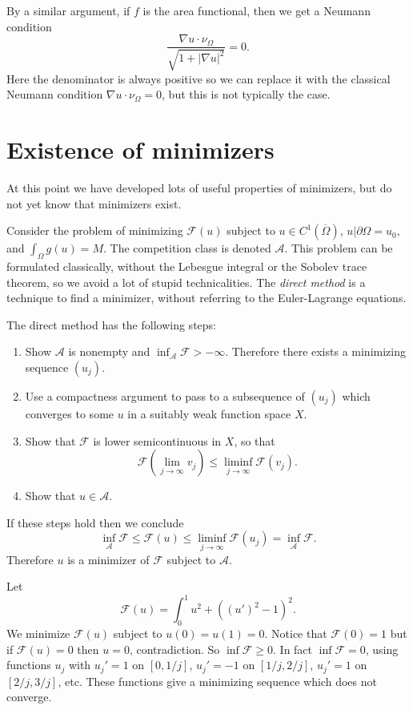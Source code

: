\documentclass[12pt]{book}
\newcommand{\dfn}[1]{\emph{#1}\index{#1}}
\theoremstyle{definition}
\newenvironment{example}
  {\pushQED{\qed}\renewcommand{\qedsymbol}{$\diamondsuit$}\examplex}
  {\popQED\endexamplex}
\begin{document}
\begin{example}
By a similar argument, if $f$ is the area functional, then we get a Neumann condition
$$\frac{\nabla u \cdot \nu_\Omega}{\sqrt{1 + |\nabla u|^2}} = 0.$$
Here the denominator is always positive so we can replace it with the classical Neumann condition $\nabla u \cdot \nu_\Omega = 0$, but this is not typically the case.
\end{example}

\section{Existence of minimizers}
At this point we have developed lots of useful properties of minimizers, but do not yet know that minimizers exist.

Consider the problem of minimizing $\mathcal F(u)$ subject to $u \in C^1(\overline \Omega)$, $u|\partial \Omega = u_0$, and $\int_\Omega g(u) = M$. The competition class is denoted $\mathcal A$.
This problem can be formulated classically, without the Lebesgue integral or the Sobolev trace theorem, so we avoid a lot of stupid technicalities.
The \dfn{direct method} is a technique to find a minimizer, without referring to the Euler-Lagrange equations.

The direct method has the following steps:
\begin{enumerate}
\item Show $\mathcal A$ is nonempty and $\inf_{\mathcal A} \mathcal F > -\infty$. Therefore there exists a minimizing sequence $(u_j)$.
\item Use a compactness argument to pass to a subsequence of $(u_j)$ which converges to some $u$ in a suitably weak function space $X$.
\item Show that $\mathcal F$ is lower semicontinuous in $X$, so that
$$\mathcal F\left(\lim_{j \to \infty} v_j\right) \leq \liminf_{j \to \infty} \mathcal F(v_j).$$
\item Show that $u \in \mathcal A$.
\end{enumerate}
If these steps hold then we conclude
$$\inf_{\mathcal A} \mathcal F \leq \mathcal F(u) \leq \liminf_{j \to \infty} \mathcal F(u_j) = \inf_{\mathcal A} \mathcal F.$$
Therefore $u$ is a minimizer of $\mathcal F$ subject to $\mathcal A$.

\begin{example}
Let
$$\mathcal F(u) = \int_0^1 u^2 + ((u')^2 - 1)^2.$$
We minimize $\mathcal F(u)$ subject to $u(0) = u(1) = 0$.
Notice that $\mathcal F(0) = 1$ but if $\mathcal F(u) = 0$ then $u = 0$, contradiction.
So $\inf \mathcal F \geq 0$. In fact $\inf \mathcal F = 0$, using functions $u_j$ with $u_j' = 1$ on $[0, 1/j]$, $u_j' = -1$ on $[1/j, 2/j]$, $u_j' = 1$ on $[2/j, 3/j]$, etc.
These functions give a minimizing sequence which does not converge.
\end{example}
\end{document}
